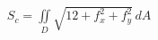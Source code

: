 \documentclass[preview]{standalone}
\begin{document}
\begin{align*}
S_c = \iint\limits_D \sqrt{12 + f_x^2 + f_y^2}\, dA
\end{align*}
\end{document}
